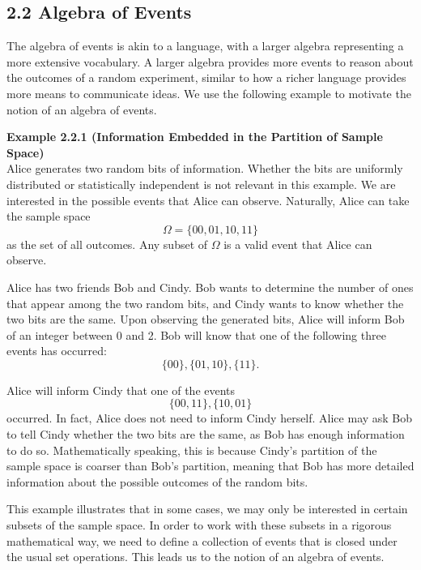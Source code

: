 \subsection*{2.2 Algebra of Events}

The algebra of events is akin to a language, with a larger algebra representing a more extensive vocabulary. A larger algebra provides more events to reason about the outcomes of a random experiment, similar to how a richer language provides more means to communicate ideas. We use the following example to motivate the notion of an algebra of events.

\textbf{Example 2.2.1 (Information Embedded in the Partition of Sample Space)} \\
Alice generates two random bits of information. Whether the bits are uniformly distributed or statistically independent is not relevant in this example. We are interested in the possible events that Alice can observe. Naturally, Alice can take the sample space
\[
\Omega=\{00,01,10,11\}
\]
as the set of all outcomes. Any subset of $\Omega$ is a valid event that Alice can observe.

Alice has two friends Bob and Cindy. Bob wants to determine the number of ones that appear among the two random bits, and Cindy wants to know whether the two bits are the same. Upon observing the generated bits, Alice will inform Bob of an integer between 0 and 2. Bob will know that one of the following three events has occurred:
\[
\{00\}, \{01,10\}, \{11\}.
\]

Alice will inform Cindy that one of the events
\[
\{00,11\}, \{10,01\}
\]
occurred. In fact, Alice does not need to inform Cindy herself. Alice may ask Bob to tell Cindy whether the two bits are the same, as Bob has enough information to do so. Mathematically speaking, this is because Cindy's partition of the sample space is coarser than Bob's partition, meaning that Bob has more detailed information about the possible outcomes of the random bits.

This example illustrates that in some cases, we may only be interested in certain subsets of the sample space. In order to work with these subsets in a rigorous mathematical way, we need to define a collection of events that is closed under the usual set operations. This leads us to the notion of an algebra of events.


